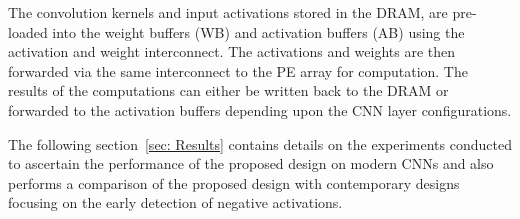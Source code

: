 \documentclass[conference]{IEEEtran}
\begin{document}
The convolution kernels and input activations stored in the DRAM, are pre-loaded into the weight buffers (WB) and activation buffers (AB) using the activation and weight interconnect. The activations and weights are then forwarded via the same interconnect to the PE array for computation. The results of the computations can either be written back to the DRAM or forwarded to the activation buffers depending upon the CNN layer configurations.







The following section~\ref{sec: Results} contains details on the experiments conducted to ascertain the performance of the proposed design on modern CNNs and also performs a comparison of the proposed design with contemporary designs focusing on the early detection of negative activations.
\end{document}
